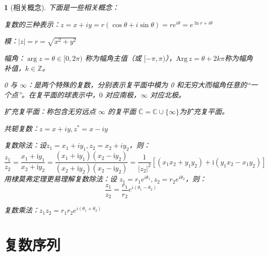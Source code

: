 \documentclass[UTF8]{report}
\def\Arg{\mathrm{Arg}\,}
\def\Z{\mathbb{Z}}
\def\C{\mathbb{C}}
\theoremstyle{MyLineTheoremStyle} %
\theoremstyle{MyBlockTheoremStyle} %
\theoremstyle{MySubsubsectionStyle} %
\newtheorem{definition}{}
\begin{document}
\begin{definition}[相关概念] 
    下面是一些相关概念：
\begin{circledenum}
    \item 复数的三种表示：$z = x + iy = r(\cos \theta + i\sin \theta) =  re^{i\theta} = e^{\ln r + i\theta}$
    \item 模：$|z| = r =\sqrt{x^2+y^2}$
    \item 幅角：$\arg z = \theta \in [0, 2\pi)$ 称为幅角主值（或 $[-\pi, \pi)$），$\Arg z = \theta + 2k\pi$称为幅角补值，$k\in\Z$。
    \item 0 与 $\infty$：是两个特殊的复数，分别表示复平面中模为 0 和无穷大而幅角任意的“一个点”。在复平面的球表示中，$0$ 对应南极，$\infty$ 对应北极。
    \item 扩充复平面：称包含无穷远点 $\infty$ 的复平面 $\overline{\C} = \C \cup \{\infty\}$为扩充复平面。
    \item 共轭复数：$ z = x + iy, z^* = x - iy$
    \item 复数除法：设$z_1 = x_1 + iy_1, z_2 = x_2 + iy_2$，则：
    \begin{equation}
    \frac{z_1}{z_2}= \frac{x_1+\mathrm{i}y_1}{x_2+\mathrm{i}y_2}=\frac{(x_1+\mathrm{i}y_1)(x_2-\mathrm{i}y_2)}{(x_2+\mathrm{i}y_2)(x_2-\mathrm{i}y_2)} = \frac{1}{| z_2 |^2}\left[ (x_1x_2+y_1y_2) + \mathrm{i}(y_1x_2-x_1y_2) \right]
    \end{equation}
    用棣莫弗定理更易理解复数除法：设 $z_1 = r_1e^{i\theta_1}, z_2 = r_2e^{i\theta_2}$，则： 
    \begin{equation}
    \frac{z_1}{z_2} = \frac{r_1}{r_2}e^{i(\theta_1-\theta_2)}
    \end{equation}
    \item 复数乘法：$z_1z_2 = r_1r_2e^{i(\theta_1+\theta_2)}$
\end{circledenum}



\end{definition}


\section{复数序列}
\end{document}

